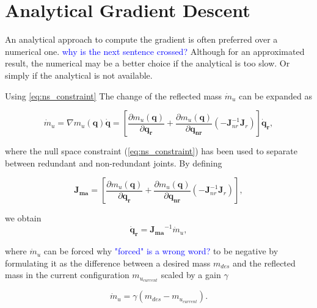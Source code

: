 \section{Analytical Gradient Descent}
\label{sec:analytical}

An analytical approach to compute the gradient is often preferred over a numerical one. \textcolor{blue}{why is the next sentence crossed?} Although for an approximated result, the numerical may be a better choice if the analytical is too slow. Or simply if the analytical is not available.




Using \ref{eq:ns_constraint} The change of the reflected mass ${\dot{m}_u}$ can be expanded as

\begin{equation}
{\dot{m}_u}=\nabla m_u(\mathbf{q}) \dot{\mathbf{q}} = \left[ \frac{\partial {m_u(\mathbf{q})}}{\partial{\mathbf{q_{r}}}} + \frac{\partial {m_u(\mathbf{q})}}{\partial{\mathbf{q_{nr}}}}  (- \mathbf{J}_{nr}^{-1} \mathbf{J}_r) \right ]  \mathbf{\dot{q}_r} ,
\label{eq:mass_expanded}
\end{equation}

where the null space constraint (\ref{eq:ns_constraint}) has been used to separate between redundant and non-redundant joints. By defining

\begin{equation}
\mathbf{J_{ma}} = \left[ \frac{\partial {m_u(\mathbf{q})}}{\partial{\mathbf{q_{r}}}} + \frac{\partial {m_u(\mathbf{q})}}{\partial{\mathbf{q_{nr}}}}  (- \mathbf{J}_{nr}^{-1} \mathbf{J}_r) \right ] ,
\label{eq:jma}
\end{equation}

we obtain 
\begin{equation}
\mathbf{\dot{q}_r} = \mathbf{J_{ma}}^{-1} {\dot{m}_u},
\label{eq:qr_jma}
\end{equation}

where ${\dot{m}_u}$ can be forced why \textcolor{blue}{"forced" is a wrong word?} to be negative by formulating it as the difference between a desired mass $m_{des}$ and the reflected mass in the current configuration $m_{u_{current}}$ scaled by a gain $\gamma$


\begin{equation}
{\dot{m}_u} =  \gamma (m_{des} - m_{u_{current}}).
\label{eq:m_dot_analytical_1}
\end{equation}

